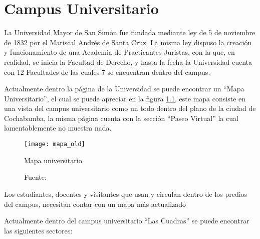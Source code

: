\chapter{Campus Universitario}
\label{chap:Campus Universitario}

La Universidad Mayor de San Simón fue fundada mediante ley de 5 de noviembre de 1832 por el Mariscal Andrés de Santa Cruz. La misma ley dispuso la creación y funcionamiento de una Academia de Practicantes Juristas, con la que, en realidad, se inicia la Facultad de Derecho, y hasta la fecha la Universidad cuenta con 12 Facultades de las cuales 7 se encuentran dentro del campus. \cite{umss_history}

Actualmente dentro la página de la Universidad se puede encontrar un ``Mapa Universitario'', el cual se puede apreciar en la figura \ref{fig:mapa_old}, este mapa consiste en una vista del campus universitario como un todo dentro del plano de la ciudad de Cochabamba, la misma página cuenta con la sección ``Paseo Virtual'' la cual lamentablemente no muestra nada.\\

\begin{figure}[H]
  \begin{center}
    \texttt{[image: mapa\_old]}
    \caption{Mapa universitario}
    \label{fig:mapa_old}
    \caption*{Fuente: \cite{umss_mapa}}
  \end{center}
\end{figure}


Los estudiantes, docentes y visitantes que usan y circulan dentro de los predios del campus, necesitan contar con un mapa más actualizado


Actualmente dentro del campus universitario ``Las Cuadras'' se puede encontrar las siguientes sectores:

